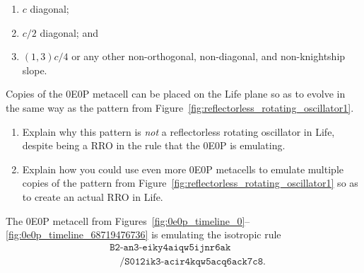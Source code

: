 \begin{multicols}{2}
\begin{problem}
\begin{enumerate}[label=\bf\color{ocre}(\alph*)]
			\item {} $c$ diagonal;
			
			\item {} $c/2$ diagonal; and
			
			\item {} $(1,3)c/4$ or any other non-orthogonal, non-diagonal, and non-knightship slope.
			
		\end{enumerate}
	\end{problem}


	\mfilbreak
	
	
	\begin{problem}\label{exer:0e0p_rro_technicalities} 
		Copies of the 0E0P metacell can be placed on the Life plane so as to evolve in the same way as the pattern from Figure~\ref{fig:reflectorless_rotating_oscillator1}.\smallskip
		
		\begin{enumerate}[label=\bf\color{ocre}(\alph*)]
			\item Explain why this pattern is \emph{not} a reflectorless rotating oscillator in Life, despite being a RRO in the rule that the 0E0P is emulating.
			
			\item Explain how you could use even more 0E0P metacells to emulate multiple copies of the pattern from Figure~\ref{fig:reflectorless_rotating_oscillator1} so as to create an actual RRO in Life.
		\end{enumerate}
	\end{problem}

	
	\mfilbreak
	
	
	\begin{problem}\label{exer:0e0p_single_cell_rro_rule}
		The 0E0P metacell from Figures~\ref{fig:0e0p_timeline_0}--\ref{fig:0e0p_timeline_68719476736} is emulating the isotropic rule
		\begin{align*}
			& \texttt{B2-an3-eiky4aiqw5ijnr6ak} \\
			& \quad \texttt{/S012ik3-acir4kqw5acq6ack7c8}.
		\end{align*}
		

\end{problem}
\end{multicols}
